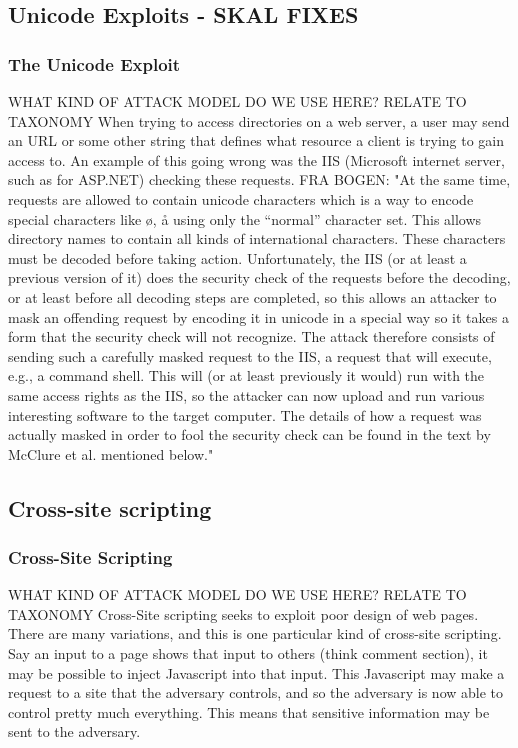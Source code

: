     \subsection{Unicode Exploits - SKAL FIXES}
        \begin{frame}
            \frametitle{The Unicode Exploit}
                WHAT KIND OF ATTACK MODEL DO WE USE HERE? RELATE TO TAXONOMY
                When trying to access directories on a web server, a user may send an URL or some other string that defines what resource a client is trying to gain access to. An example of this going wrong was the IIS (Microsoft internet server, such as for ASP.NET) checking these requests. 
                FRA BOGEN:
                "At the same time, requests are allowed to contain unicode characters which is a way to encode special characters like ø, å using only the “normal” character set. This allows directory names to contain all kinds of international characters. These characters must be decoded before taking action. Unfortunately, the IIS (or at least a previous version of it) does the security check of the requests before the decoding, or at least before all decoding steps are completed, so this allows an attacker to mask an offending request by encoding it in unicode in a special way so it takes a form that the security check will not recognize. The attack therefore consists of sending such a carefully masked request to the IIS, a request that will execute, e.g., a command shell. This will (or at least previously it would) run with the same access rights as the IIS, so the attacker can now upload and run various interesting software to the target computer.
                The details of how a request was actually masked in order to fool the security check can be found in the text by McClure et al. mentioned below."
        \end{frame}
\subsection{Cross-site scripting}
        \begin{frame}
            \frametitle{Cross-Site Scripting}
                WHAT KIND OF ATTACK MODEL DO WE USE HERE? RELATE TO TAXONOMY
                Cross-Site scripting seeks to exploit poor design of web pages. There are many variations, and this is one particular kind of cross-site scripting. Say an input to a page shows that input to others (think comment section), it may be possible to inject Javascript into that input. This Javascript may make a request to a site that the adversary controls, and so the adversary is now able to control pretty much everything. This means that sensitive information may be sent to the adversary.  
        \end{frame}

